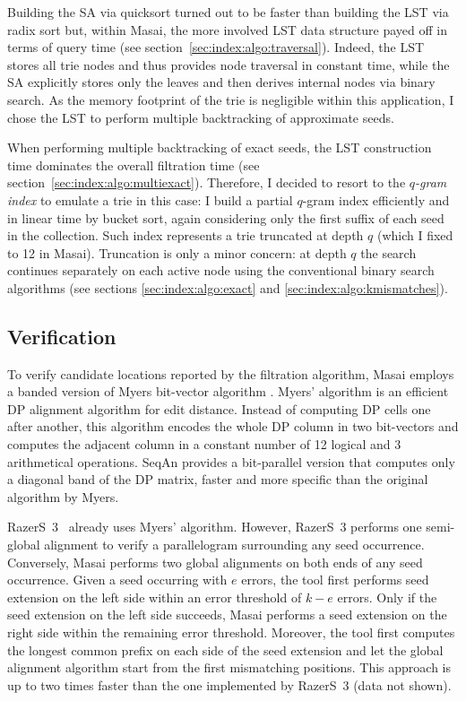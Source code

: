 Building the SA via quicksort turned out to be faster than building the LST via radix sort but, within Masai, the more involved LST data structure payed off in terms of query time (see section~\ref{sec:index:algo:traversal}).
Indeed, the LST stores all trie nodes and thus provides node traversal in constant time, while the SA explicitly stores only the leaves and then derives internal nodes via binary search.
As the memory footprint of the trie is negligible within this application, I chose the LST to perform multiple backtracking of approximate seeds.

When performing multiple backtracking of exact seeds, the LST construction time dominates the overall filtration time (see section~\ref{sec:index:algo:multiexact}).
Therefore, I decided to resort to the \emph{$q$-gram index} to emulate a trie in this case:
I build a partial $q$-gram index efficiently and in linear time by bucket sort, again considering only the first suffix of each seed in the collection.
Such index represents a trie truncated at depth $q$ (which I fixed to 12 in Masai).
Truncation is only a minor concern: at depth $q$ the search continues separately on each active node using the conventional binary search algorithms (see sections \ref{sec:index:algo:exact} and \ref{sec:index:algo:kmismatches}).

\subsection{Verification}
\label{masai:engineering:extension}

To verify candidate locations reported by the filtration algorithm, Masai employs a banded version of Myers bit-vector algorithm \citep{Myers1999}.
Myers' algorithm is an efficient DP alignment algorithm \citep{Needleman1970} for edit distance. 
Instead of computing DP cells one after another, this algorithm encodes the whole DP column in two bit-vectors and computes the adjacent column in a constant number of 12 logical and 3 arithmetical operations.
SeqAn provides a bit-parallel version that computes only a diagonal band of the DP matrix, faster and more specific than the original algorithm by Myers.

RazerS~3~\citep{Weese2012} already uses Myers' algorithm.
However, RazerS~3 performs one semi-global alignment to verify a parallelogram surrounding any seed occurrence.
Conversely, Masai performs two global alignments on both ends of any seed occurrence.
Given a seed occurring with $e$ errors, the tool first performs seed extension on the left side within an error threshold of $k - e$ errors.
Only if the seed extension on the left side succeeds, Masai performs a seed extension on the right side within the remaining error threshold.
Moreover, the tool first computes the longest common prefix on each side of the seed extension and let the global alignment algorithm start from the first mismatching positions.
This approach is up to two times faster than the one implemented by RazerS~3 (data not shown).

